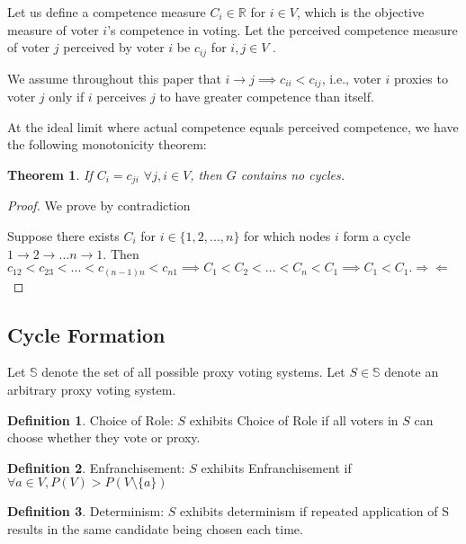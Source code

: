 \documentclass[10pt]{article}
\newtheorem{theorem}{Theorem}[section]
\theoremstyle{definition}
\newtheorem{definition}{Definition}[section]
\newcommand{\bb}[1]{\mathbb{#1}}
\begin{document}
Let us define a competence measure $C_i \in \mathbb{R}$ for $ i \in V$, which is the objective measure of voter $i$'s competence in voting. Let the perceived competence measure of voter $j$ perceived by voter $i$ be $c_{ij}$ for $i, j \in V$ . 

We assume throughout this paper that $i \rightarrow j \implies c_{ii} < c_{ij}$, i.e., voter $i$ proxies to voter $j$ only if $i$ perceives $j$ to have greater competence than itself.


At the ideal limit where actual competence equals perceived competence, we have the following monotonicity theorem:

\begin{theorem}

If $C_i = c_{ji}$ $\forall j, i \in V$, then $G$ contains no cycles.

\end{theorem}

\begin{proof}

We prove by contradiction

Suppose there exists $C_i$ for $i \in \{1, 2, ..., n\}$ for which nodes $i$ form a cycle $1 \rightarrow 2 \rightarrow ... n \rightarrow 1$. Then $c_{12} < c_{23 }< ... < c_{(n-1)n} < c_{n1} \implies C_1 < C_2 < ... < C_n < C_1 \implies C_1 < C_1. \Rightarrow\Leftarrow$
\end{proof}

\subsection{Cycle Formation}
Let $\bb{S}$ denote the set of all possible proxy voting systems. Let $S \in \bb{S}$ denote an arbitrary proxy voting system.


\theoremstyle{definition}
\begin{definition}{Choice of Role:}
$S$ exhibits Choice of Role if all voters in $S$ can choose whether they vote or proxy.
\end{definition}

\theoremstyle{definition}
\begin{definition}{Enfranchisement:}
$S$ exhibits Enfranchisement if $\forall a \in V, P(V) > P(V\setminus\{a\})$
\end{definition}

\theoremstyle{definition}
\begin{definition}{Determinism:}
$S$ exhibits determinism if repeated application of S results in the same candidate being chosen each time.
\end{definition}
\end{document}
